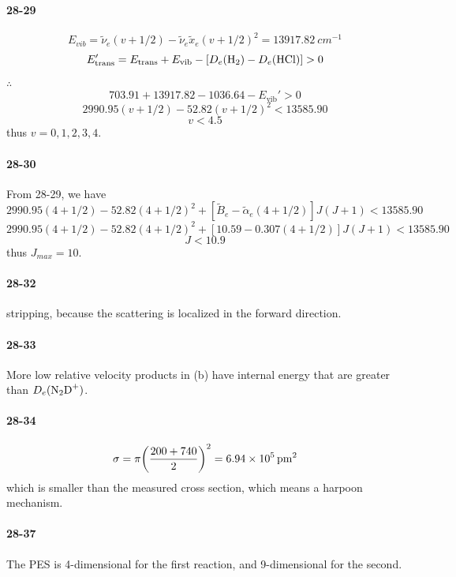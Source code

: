 \documentclass[a4paper]{article}
\newcommand{\ex}[1]{\paragraph{28-#1}}
\numberwithin{equation}{section}
\begin{document}
\ex{29}
\begin{equation}\label{key}
E_{vib} = \tilde{\nu}_e(v+1/2) - \tilde{\nu}_e\tilde{x}_e(v+1/2)^2 = \SI{13917.82}{cm^{-1}}
\end{equation}
\begin{equation}\label{key}
E_{\text{trans}}' = E_{\text{trans}} + E_{\text{vib}} - [D_e(\ce{H_2})-D_e(\ce{HCl})] > 0
\end{equation}
$ \therefore $
\begin{equation}\label{key}
703.91 + 13917.82 - 1036.64   - E_{\text{vib}}' > 0 
\end{equation}
\begin{equation}\label{key}
2990.95(v+1/2) - 52.82(v+1/2)^2 < 13585.90
\end{equation}
\begin{equation}\label{key}
v < 4.5
\end{equation}
thus $ v = 0,1,2,3,4 $.

\ex{30}
From 28-29, we have
\begin{equation}\label{key}
2990.95(4+1/2) - 52.82(4+1/2)^2 + [\tilde{B}_e - \tilde\alpha_e(4+1/2)]J(J+1) < 13585.90
\end{equation}
\begin{equation}\label{key}
2990.95(4+1/2) - 52.82(4+1/2)^2 + [10.59 - 0.307(4+1/2)]J(J+1) < 13585.90
\end{equation}
\begin{equation}\label{key}
J < 10.9
\end{equation}
thus $ J_{max} = 10 $.

\ex{32}
stripping, because the scattering is localized in the forward direction.


\ex{33}
More low relative velocity products in (b) have internal energy that are greater than $ D_e(\ce{N_2D^+}) $. 


\ex{34}
\begin{equation}\label{key}
\sigma = \pi\qty(\dfrac{200 + 740}{2})^2 = \SI{6.94e5}{pm^2}
\end{equation}
which is smaller than the measured cross section, which means a harpoon mechanism.


\ex{37}
The PES is 4-dimensional for the first reaction, and 9-dimensional for the second.







\end{document}

